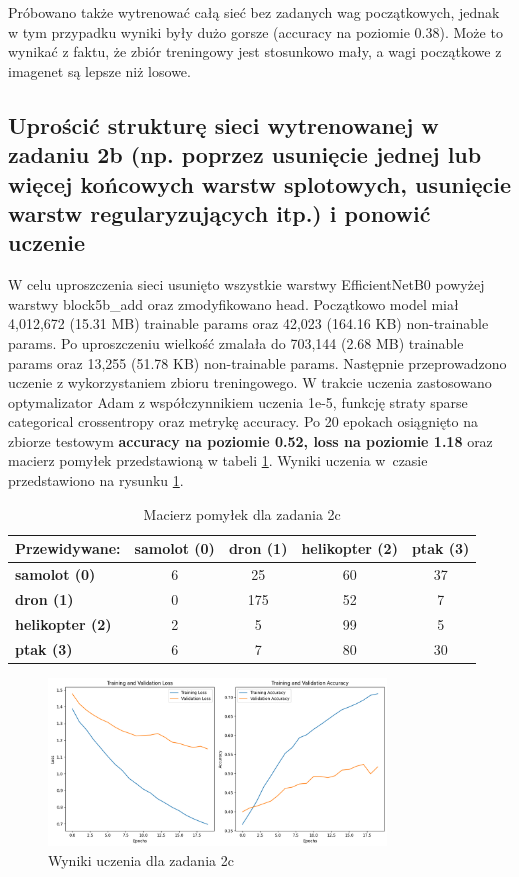 Próbowano także wytrenować całą sieć bez zadanych wag początkowych, jednak w tym przypadku wyniki były dużo gorsze (accuracy na poziomie 0.38). Może to wynikać z faktu, że zbiór treningowy jest stosunkowo mały, a wagi początkowe z imagenet są lepsze niż losowe.

\subsection{Uprościć strukturę sieci wytrenowanej w zadaniu 2b (np. poprzez usunięcie jednej lub więcej końcowych warstw splotowych, usunięcie warstw regularyzujących itp.) i ponowić uczenie}

W celu uproszczenia sieci usunięto wszystkie warstwy EfficientNetB0 powyżej warstwy block5b\_add oraz zmodyfikowano head. Początkowo model miał 4,012,672 (15.31 MB) trainable params oraz 42,023 (164.16 KB) non-trainable params. Po uproszczeniu wielkość zmalała do 703,144 (2.68 MB) trainable params oraz 13,255 (51.78 KB) non-trainable params. Następnie przeprowadzono uczenie z wykorzystaniem zbioru treningowego. W trakcie uczenia zastosowano optymalizator Adam z współczynnikiem uczenia 1e-5, funkcję straty sparse categorical crossentropy oraz metrykę accuracy. Po 20 epokach osiągnięto na zbiorze testowym \textbf{accuracy na poziomie 0.52, loss na poziomie 1.18} oraz macierz pomyłek przedstawioną w tabeli \ref{tab:z2c}. Wyniki uczenia w~czasie przedstawiono na rysunku \ref{fig:z2c}.


\begin{table}[ht]
\centering
\begin{tabular}{|l|c|c|c|c|}
\hline
Przewidywane: & \textbf{samolot (0)} & \textbf{dron (1)} & \textbf{helikopter (2)} & \textbf{ptak (3)} \\ \hline
\textbf{samolot (0)} & 6 & 25 & 60 & 37 \\ \hline
\textbf{dron (1)} & 0 & 175 & 52 & 7 \\ \hline
\textbf{helikopter (2)} & 2 & 5 & 99 & 5 \\ \hline
\textbf{ptak (3)} & 6 & 7 & 80 & 30 \\ \hline
\end{tabular}
\caption{Macierz pomyłek dla zadania 2c}
\label{tab:z2c}
\end{table}

\begin{figure}[H]
    \centering
    \includegraphics[width=0.8\textwidth]{img/z2c.png}
    \caption{Wyniki uczenia dla zadania 2c}
    \label{fig:z2c}
\end{figure}

